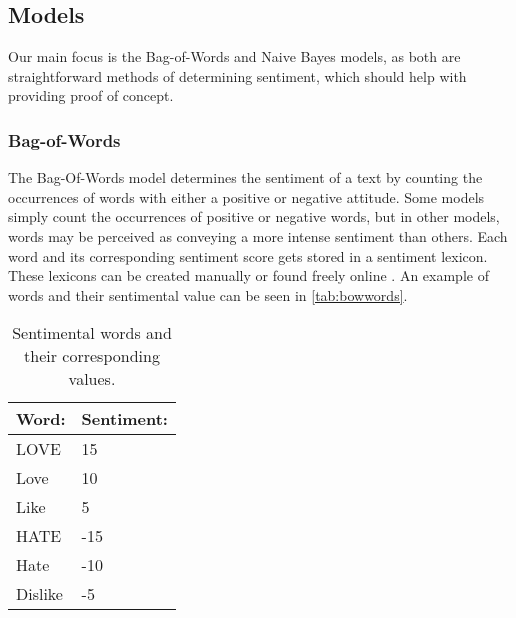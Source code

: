 \subsection{Models}\label{subsub:Models}
% 

Our main focus is the Bag-of-Words and Naive Bayes models, as both
are straightforward methods of determining sentiment, which should help with
providing proof of concept.

\subsubsection{Bag-of-Words}
The Bag-Of-Words model determines the sentiment of a text by counting the
occurrences of words with either a positive or negative attitude. Some models
simply count the occurrences of positive or negative words, but in other
models, words may be perceived as conveying a more intense sentiment than others. Each
word and its corresponding sentiment score gets stored in a sentiment lexicon.
These lexicons can be created manually or found freely online
\citep{BagOfWords}. An example of words and their sentimental value can be seen
in \autoref{tab:bowwords}.

\begin{table}[H]\centering
\begin{tabular}{|l|l|}\hline
\textbf{Word:} & \textbf{Sentiment:} \\\hline
LOVE	&	15	\\\hline
Love	&	10	\\\hline
Like	&	5	\\\hline
HATE	&	-15	\\\hline
Hate	&	-10	\\\hline
Dislike	&	-5	\\\hline
\end{tabular}
\caption{Sentimental words and their corresponding values.}
\label{tab:bowwords}
\end{table}

